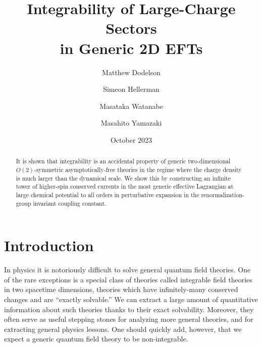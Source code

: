 \documentclass[12pt]{article}
\begin{document}
\title{{{\Huge Integrability of Large-Charge Sectors \\ \medskip in Generic 2D EFTs}}}
\author[1,2]{Matthew Dodelson}
\author[2]{Simeon Hellerman}
\author[3,4,5]{Masataka Watanabe}
\author[2,6]{Masahito Yamazaki}
\date{October 2023}

\maketitle

\begin{abstract}
It is shown that integrability is an accidental property of generic two-dimensional $O(2)$-symmetric asymptotically-free theories in the regime where the charge density is much larger than the dynamical scale. We show this by constructing an infinite tower of higher-spin conserved currents in the most generic effective Lagrangian at large chemical potential to all orders in perturbative expansion in the renormalization-group invariant coupling constant.
\end{abstract}
\newpage
{}
\pagestyle{plain}


\section{Introduction}

In physics it is notoriously difficult to solve general quantum field theories.
One of the rare exceptions is a special class of theories called integrable field theories in two spacetime dimensions,
theories which have infinitely-many conserved changes and are ``exactly solvable.''
We can extract a large amount of  quantitative information about such theories thanks to  their exact solvability. Moreover, they often serve as useful stepping stones for analyzing more general theories,
and for extracting general physics lessons. One should quickly add, however,
that we expect a generic quantum field theory to be non-integrable.
\end{document}
